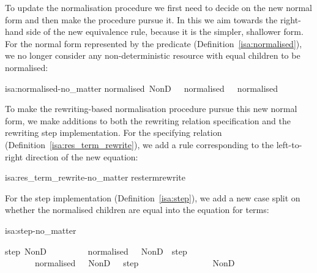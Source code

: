 \documentclass[class=smolathesis,crop=false]{standalone}
\begin{document}
To update the normalisation procedure we first need to decide on the new normal form and then make the procedure pursue it.
In this we aim towards the right-hand side of the new equivalence rule, because it is the simpler, shallower form.
For the normal form represented by the predicate  (Definition~\ref{isa:normalised}), we no longer consider any non-deterministic resource with equal children to be normalised:
\begin{isadef}{isa:normalised-no_matter}
\centering
  {\isachardoublequoteopen}normalised\ {\isacharparenleft}NonD\ \ {\isasymequiv}\ normalised\ \ {\isasymand}\ normalised\ \ {\isasymand}\ \ \isasymnoteq\ 
\end{isadef}

To make the rewriting-based normalisation procedure pursue this new normal form, we make additions to both the rewriting relation specification and the rewriting step implementation.
For the specifying relation (Definition~\ref{isa:res_term_rewrite}), we add a rule corresponding to the left-to-right direction of the new equation:
\begin{isadef}{isa:res_term_rewrite-no_matter}
\centering
  res{\isacharunderscore}term{\isacharunderscore}rewrite\ \ 
\end{isadef}

For the step implementation (Definition~\ref{isa:step}), we add a new case split on whether the normalised children are equal into the equation for  terms:
\begin{isadefraw}{isa:step-no_matter}
  \begin{center}
    \begin{minipage}{0.6\textwidth}
      \begin{isabelle}
        {\isachardoublequoteopen}step\ {\isacharparenleft}NonD\ \ \ \ {\isacharequal}\isanewline
        \ \ {\isacharparenleft}\ \ {\isasymnot}\ normalised\ \ \ NonD\ \ {\isacharparenleft}step\ \ \isanewline
        \ \ \ \ \ \ {\isasymnot}\ normalised\ \ \ NonD\ \ \ {\isacharparenleft}step\ \isanewline
        \ \ \ \ \ \ \ \isacharequal\ \ \ \isanewline
        \ \ \ \ \ NonD\ \ \ 
      \end{isabelle}
    \end{minipage}
  \end{center}
\end{isadefraw}
\end{document}
